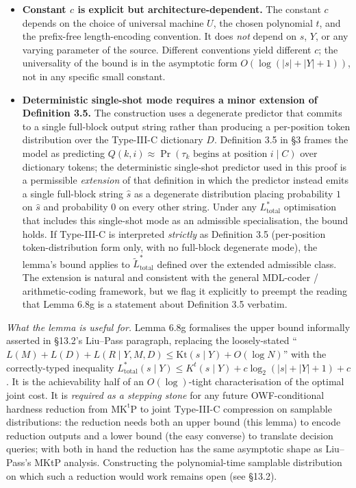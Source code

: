 \documentclass[
]{article}
\begin{document}
\begin{itemize}
optimisation. The two measures coincide up to $O(\log)$ factors when
the chosen $t$ matches the running time of the optimal program, but
diverge in general; the formal statement of Lemma 6.8g uses $K^t$
because that is the measure for which Liu--Pass establish the
OWF-equivalence anchor cited in §13.2.
\item \textbf{Constant $c$ is explicit but architecture-dependent.}
The constant $c$ depends on the choice of universal machine $U$, the
chosen polynomial $t$, and the prefix-free length-encoding
convention. It does \emph{not} depend on $s$, $Y$, or any varying
parameter of the source. Different conventions yield different $c$;
the universality of the bound is in the asymptotic form
$O(\log(|s|+|Y|+1))$, not in any specific small constant.
\item \textbf{Deterministic single-shot mode requires a minor
extension of Definition 3.5.} The construction uses a degenerate
predictor that commits to a single full-block output string rather
than producing a per-position token distribution over the Type-III-C
dictionary $D$. Definition 3.5 in §3 frames the model as predicting
$Q(k, i) \approx \Pr(\tau_k \text{ begins at position } i \mid C)$
over dictionary tokens; the deterministic single-shot predictor used
in this proof is a permissible \emph{extension} of that definition
in which the predictor instead emits a single full-block string
$\hat{s}$ as a degenerate distribution placing probability $1$ on
$\hat{s}$ and probability $0$ on every other string. Under any
$L^*_{\mathrm{total}}$ optimisation that includes this single-shot
mode as an admissible specialisation, the bound holds. If
Type-III-C is interpreted \emph{strictly} as Definition 3.5
(per-position token-distribution form only, with no full-block
degenerate mode), the lemma's bound applies to
$\widetilde{L}^*_{\mathrm{total}}$ defined over the extended
admissible class. The extension is natural and consistent with the
general MDL-coder / arithmetic-coding framework, but we flag it
explicitly to preempt the reading that Lemma 6.8g is a statement
about Definition 3.5 verbatim.
\end{itemize}

\emph{What the lemma is useful for.} Lemma 6.8g formalises the upper
bound informally asserted in §13.2's Liu--Pass paragraph, replacing
the loosely-stated ``$L(M) + L(D) + L(R \mid Y, M, D) \leq
\mathrm{Kt}(s \mid Y) + O(\log N)$'' with the correctly-typed
inequality $L^*_{\mathrm{total}}(s \mid Y) \leq K^t(s \mid Y) +
c \log_2(|s|+|Y|+1) + c$. It is the achievability half of an
$O(\log)$-tight characterisation of the optimal joint cost. It is
\emph{required as a stepping stone} for any future OWF-conditional
hardness reduction from $\mathrm{MK^t P}$ to joint Type-III-C
compression on samplable distributions: the reduction needs both an
upper bound (this lemma) to encode reduction outputs and a lower
bound (the easy converse) to translate decision queries; with both
in hand the reduction has the same asymptotic shape as Liu--Pass's
MKtP analysis. Constructing the polynomial-time samplable distribution
on which such a reduction would work remains open (see §13.2).
\end{document}
